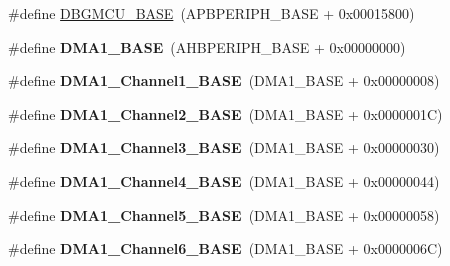 \begin{DoxyCompactItemize}
\item 
\#define \hyperlink{group___peripheral__memory__map_ga4adaf4fd82ccc3a538f1f27a70cdbbef}{D\+B\+G\+M\+C\+U\+\_\+\+B\+A\+SE}~(A\+P\+B\+P\+E\+R\+I\+P\+H\+\_\+\+B\+A\+SE + 0x00015800)
\item 
\mbox{\label{group___peripheral__memory__map_gab2d8a917a0e4ea99a22ac6ebf279bc72}} 
\#define {\bfseries D\+M\+A1\+\_\+\+B\+A\+SE}~(A\+H\+B\+P\+E\+R\+I\+P\+H\+\_\+\+B\+A\+SE + 0x00000000)
\item 
\mbox{\label{group___peripheral__memory__map_ga888dbc1608243badeb3554ffedc7364c}} 
\#define {\bfseries D\+M\+A1\+\_\+\+Channel1\+\_\+\+B\+A\+SE}~(D\+M\+A1\+\_\+\+B\+A\+SE + 0x00000008)
\item 
\mbox{\label{group___peripheral__memory__map_ga38a70090eef3687e83fa6ac0c6d22267}} 
\#define {\bfseries D\+M\+A1\+\_\+\+Channel2\+\_\+\+B\+A\+SE}~(D\+M\+A1\+\_\+\+B\+A\+SE + 0x0000001\+C)
\item 
\mbox{\label{group___peripheral__memory__map_ga70b3d9f36ca9ce95b4e421c11154fe5d}} 
\#define {\bfseries D\+M\+A1\+\_\+\+Channel3\+\_\+\+B\+A\+SE}~(D\+M\+A1\+\_\+\+B\+A\+SE + 0x00000030)
\item 
\mbox{\label{group___peripheral__memory__map_ga1adc93cd0baf0897202c71110e045692}} 
\#define {\bfseries D\+M\+A1\+\_\+\+Channel4\+\_\+\+B\+A\+SE}~(D\+M\+A1\+\_\+\+B\+A\+SE + 0x00000044)
\item 
\mbox{\label{group___peripheral__memory__map_gac041a71cd6c1973964f847a68aa14478}} 
\#define {\bfseries D\+M\+A1\+\_\+\+Channel5\+\_\+\+B\+A\+SE}~(D\+M\+A1\+\_\+\+B\+A\+SE + 0x00000058)
\item 
\mbox{\label{group___peripheral__memory__map_ga896c2c7585dd8bc3969cf8561f689d2d}} 
\#define {\bfseries D\+M\+A1\+\_\+\+Channel6\+\_\+\+B\+A\+SE}~(D\+M\+A1\+\_\+\+B\+A\+SE + 0x0000006\+C)
\item 
\mbox{\label{group___peripheral__memory__map_gaeee0d1f77d0db1db533016a09351166c}} 

\end{DoxyCompactItemize}
